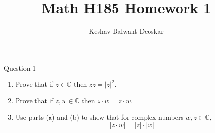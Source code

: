 \documentclass{article}
\title{Math H185 Homework 1}
\author{Keshav Balwant Deoskar}
\begin{document}
\maketitle


\begin{mathdefinitionbox}{Question 1}
\vskip 0.5cm
  \begin{enumerate}[label=(\alph*)]
    \item Prove that if $z \in \mathbb{C}$ then $z \bar{z} = |z|^2$.
    \item Prove that if $z, w \in \mathbb{C}$ then $\overline{z \cdot w} = \bar{z} \cdot \bar{w}$.
    \item Use parts (a) and (b) to show that for complex numbers $w, z \in \mathbb{C}$, 
    \[ |z \cdot w| = |z| \cdot |w| \]
  \end{enumerate}
\end{mathdefinitionbox}
\end{document}
